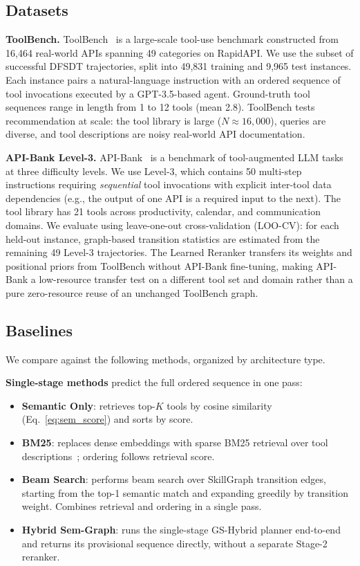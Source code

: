 \documentclass[lettersize,journal]{IEEEtran}
\begin{document}
\subsection{Datasets}

\textbf{ToolBench.}
ToolBench~\cite{toolllm} is a large-scale tool-use benchmark constructed from 16,464 real-world APIs spanning 49 categories on RapidAPI.
We use the subset of successful DFSDT trajectories, split into 49,831 training and 9,965 test instances.
Each instance pairs a natural-language instruction with an ordered sequence of tool invocations executed by a GPT-3.5-based agent.
Ground-truth tool sequences range in length from 1 to 12 tools (mean 2.8).
ToolBench tests recommendation at scale: the tool library is large ($N \approx 16{,}000$), queries are diverse, and tool descriptions are noisy real-world API documentation.

\textbf{API-Bank Level-3.}
API-Bank~\cite{apibank} is a benchmark of tool-augmented LLM tasks at three difficulty levels.
We use Level-3, which contains 50 multi-step instructions requiring \emph{sequential} tool invocations with explicit inter-tool data dependencies (e.g., the output of one API is a required input to the next).
The tool library has 21 tools across productivity, calendar, and communication domains.
We evaluate using leave-one-out cross-validation (LOO-CV): for each held-out instance, graph-based transition statistics are estimated from the remaining 49 Level-3 trajectories.
The Learned Reranker transfers its weights and positional priors from ToolBench without API-Bank fine-tuning, making API-Bank a low-resource transfer test on a different tool set and domain rather than a pure zero-resource reuse of an unchanged ToolBench graph.

\subsection{Baselines}

We compare against the following methods, organized by architecture type.

\textbf{Single-stage methods} predict the full ordered sequence in one pass:
\begin{itemize}
    \item \textbf{Semantic Only}: retrieves top-$K$ tools by cosine similarity (Eq.~\eqref{eq:sem_score}) and sorts by score.
    \item \textbf{BM25}: replaces dense embeddings with sparse BM25 retrieval over tool descriptions~\cite{bm25review}; ordering follows retrieval score.
    \item \textbf{Beam Search}: performs beam search over SkillGraph transition edges, starting from the top-1 semantic match and expanding greedily by transition weight. Combines retrieval and ordering in a single pass.
    \item \textbf{Hybrid Sem-Graph}: runs the single-stage GS-Hybrid planner end-to-end and returns its provisional sequence directly, without a separate Stage-2 reranker.
\end{itemize}
\end{document}
